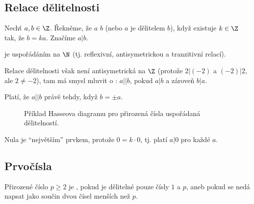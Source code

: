 \subsection{Relace dělitelnosti}\label{relDel}
Nechť $a, b \in \Z$. Řekněme, že $a$  $b$ (nebo $a$ je dělitelem $b$), když existuje $k \in \Z$ tak, že $b = ka$. Značíme $a|b$.

 je uspořádáním na $\N$ (tj. reflexivní, antisymetrickou a tranzitivní relací).

Relace dělitelnosti však není antisymetrická na $\Z$ (protože $2 | (-2)$ a $(-2) | 2$, ale $2 \not= -2$), tam má smysl mluvit o : $a || b$, pokud $a|b$ a zároveň $b|a$.

Platí, že $a||b$ právě tehdy, když $b = \pm a$.
\begin{figure}[H]
\centering
{}
\caption{Příklad Hasseova diagramu pro přirozená čísla uspořádaná dělitelností.}
\end{figure}
\vspace{-1.5em}
Nula je \enquote{největším} prvkem, protože $0 = k \cdot 0$, tj. platí $a | 0$ pro každé $a$. 

\subsection{Prvočísla}\label{prvocisla}
Přirozené číslo $p \geq 2$ je , pokud je dělitelné pouze čísly $1$ a $p$, aneb pokud se nedá napsat jako součin dvou čísel menších než $p$.

